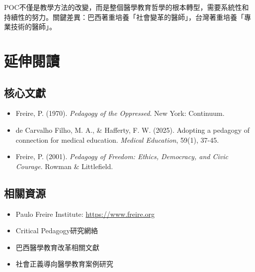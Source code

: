 \documentclass[12pt,a4paper]{article}
\newcommand{\note}[1]{
    \par
    \noindent
    \begin{tcolorbox}[
        colback=brazil_blue!5!white,
        colframe=brazil_blue,
        title=\textbf{重點提醒},
        fonttitle=\bfseries,
        boxrule=0.5pt,
        arc=3pt,
        left=6pt,
        right=6pt,
        top=6pt,
        bottom=6pt
    ]
    #1
    \end{tcolorbox}
}
\begin{document}
\vspace{0.5cm}
\note{
POC不僅是教學方法的改變，而是整個醫學教育哲學的根本轉型，需要系統性和持續性的努力。關鍵差異：巴西著重培養「社會變革的醫師」，台灣著重培養「專業技術的醫師」。
}

\section{延伸閱讀}

\subsection{核心文獻}
\begin{itemize}[nosep]
    \item Freire, P. (1970). \textit{Pedagogy of the Oppressed}. New York: Continuum.
    \item de Carvalho Filho, M. A., \& Hafferty, F. W. (2025). Adopting a pedagogy of connection for medical education. \textit{Medical Education}, 59(1), 37-45.
    \item Freire, P. (2001). \textit{Pedagogy of Freedom: Ethics, Democracy, and Civic Courage}. Rowman \& Littlefield.
\end{itemize}

\subsection{相關資源}
\begin{itemize}[nosep]
    \item Paulo Freire Institute: \url{https://www.freire.org}
    \item Critical Pedagogy研究網絡
    \item 巴西醫學教育改革相關文獻
    \item 社會正義導向醫學教育案例研究
\end{itemize}
\end{document}
